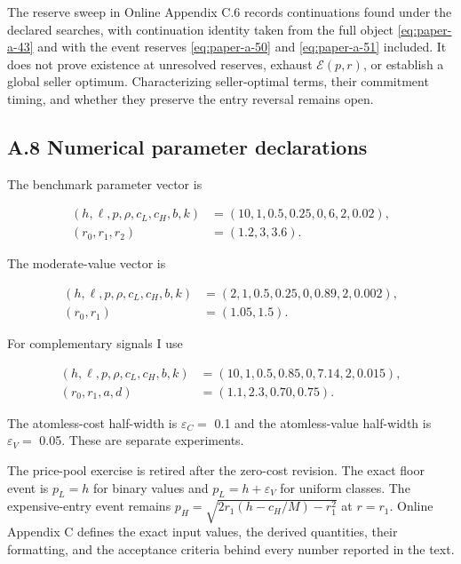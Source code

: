 \documentclass[
  12pt,
]{article}
\begin{document}
The reserve sweep in Online Appendix C.6 records continuations found
under the declared searches, with continuation identity taken from the
full object \eqref{eq:paper-a-43} and with the event reserves
\eqref{eq:paper-a-50} and \eqref{eq:paper-a-51} included. It does not
prove existence at unresolved reserves, exhaust \(\mathcal E(p,r)\), or
establish a global seller optimum. Characterizing seller-optimal terms,
their commitment timing, and whether they preserve the entry reversal
remains open.

\subsection{A.8 Numerical parameter declarations}\label{pa-parameters}

The benchmark parameter vector is

\[
\begin{aligned}
(h,\ell,p,\rho,c_L,c_H,b,k)
&=(10,1,0.5,0.25,0,6,2,0.02),\\
(r_0,r_1,r_2)&=(1.2,3,3.6).
\end{aligned}
\tag{A.55}\label{eq:paper-a-55}
\]

The moderate-value vector is

\[
\begin{aligned}
(h,\ell,p,\rho,c_L,c_H,b,k)
&=(2,1,0.5,0.25,0,0.89,2,0.002),\\
(r_0,r_1)&=(1.05,1.5).
\end{aligned}
\tag{A.56}\label{eq:paper-a-56}
\]

For complementary signals I use

\[
\begin{aligned}
(h,\ell,p,\rho,c_L,c_H,b,k)
&=(10,1,0.5,0.85,0,7.14,2,0.015),\\
(r_0,r_1,a,d)
&=(1.1,2.3,0.70,0.75).
\end{aligned}
\tag{A.57}\label{eq:paper-a-57}
\]

The atomless-cost half-width is \(\varepsilon_C=\) 0.1 and the
atomless-value half-width is \(\varepsilon_V=\) 0.05. These are separate
experiments.

The price-pool exercise is retired after the zero-cost revision. The
exact floor event is \(p_L=h\) for binary values and
\(p_L=h+\varepsilon_V\) for uniform classes. The expensive-entry event
remains \(p_H=\sqrt{2r_1(h-c_H/M)-r_1^2}\) at \(r=r_1\). Online Appendix
C defines the exact input values, the derived quantities, their
formatting, and the acceptance criteria behind every number reported in
the text.
\end{document}
